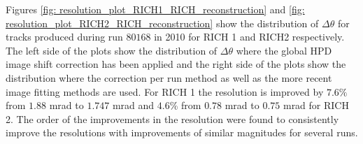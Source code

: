 Figures \ref{fig: resolution_plot_RICH1_RICH_reconstruction} and \ref{fig: resolution_plot_RICH2_RICH_reconstruction} show the distribution of $\Delta\theta$ for tracks produced during run $80168$ in 2010 for RICH 1 and RICH2 respectively. The left side of the plots show the distribution of $\Delta\theta$ where the global HPD image shift correction has been applied and the right side of the plots show the distribution where the correction per run method as well as the more recent image fitting methods are used. For RICH 1 the resolution is improved by $7.6\%$ from $1.88$ mrad to $1.747$ mrad and $4.6$\% from $0.78$ mrad to $0.75$ mrad for RICH 2. The order of the improvements in the resolution were found to consistently improve the resolutions with improvements of similar magnitudes for several runs.



%

